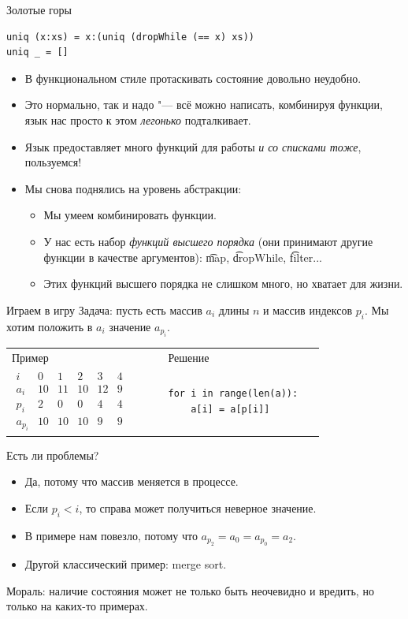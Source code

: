 \begin{frame}[fragile]{Золотые горы}
\begin{verbatim}
uniq (x:xs) = x:(uniq (dropWhile (== x) xs))
uniq _ = []
\end{verbatim}
	\begin{itemize}
		\item В функциональном стиле протаскивать состояние довольно неудобно.
		\item Это нормально, так и надо "--- всё можно написать, комбинируя функции, язык нас просто к этом \textit{легонько} подталкивает.
		\item Язык предоставляет много функций для работы \textit{и со списками тоже}, пользуемся!
		\item Мы снова поднялись на уровень абстракции:
			\begin{itemize}
				\item Мы умеем комбинировать функции.
				\item У нас есть набор \textit{функций высшего порядка} (они принимают другие функции в качестве аргументов): \t{map}, \t{dropWhile}, \t{filter}...
				\item Этих функций высшего порядка не слишком много, но хватает для жизни.
			\end{itemize}
	\end{itemize}
\end{frame}

\begin{frame}[fragile]{Играем в игру}
	Задача: пусть есть массив $a_i$ длины $n$ и массив индексов $p_i$.
	Мы хотим положить в $a_i$ значение $a_{p_i}$.
	\begin{tabular}{m{0.45\linewidth}m{0.45\linewidth}}
		\centering
		Пример & Решение \\
		\centering
		$
			\begin{array}{c|c|c|c|c|c}
				i & 0 & 1 & 2 & 3 & 4 \\\hline
				a_i & 10 & 11 & 10 & 12 & 9 \\
				p_i & 2 & 0 & 0 & 4 & 4 \\
				a_{p_i} & 10 & 10 & 10 & 9 & 9
			\end{array}
		$
		&
\begin{verbatim}
for i in range(len(a)):
    a[i] = a[p[i]]
\end{verbatim}
		\vfill
	\end{tabular}
	Есть ли проблемы?
	\pause
	\begin{itemize}
		\item Да, потому что массив меняется в процессе.
		\item Если $p_i < i$, то справа может получиться неверное значение.
		\item В примере нам повезло, потому что $a_{p_2}=a_0=a_{p_0}=a_2$.
		\item Другой классический пример: merge sort.
	\end{itemize}
	Мораль: наличие состояния может не только быть неочевидно и вредить, но только на каких-то примерах.
\end{frame}

